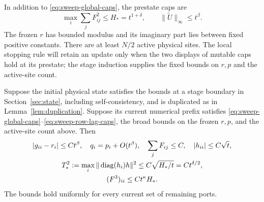 In addition to \eqref{eq:sweep-global-caps},
the prestate caps are
\begin{equation}\label{eq:sweep-row-lag-caps}
 \max_i\sum_jF_{ij}^2\le H_*=t^{1+\delta},
 \qquad \|\widetilde U\|_\infty\le t^\beta.
\end{equation}
The frozen $r$ has bounded modulus and its imaginary part lies between
fixed positive constants. There are at least $N/2$ active physical
sites. The local stopping rule will retain an update only when the two
displays of mutable caps hold at its prestate; the stage induction supplies
the fixed bounds on $r,p$ and the active-site count.

\begin{lemma}\label{lem:sweep-prestate}
Suppose the initial physical state satisfies the bounds at a stage boundary in
Section~\ref{sec:state}, including self-consistency, and is duplicated as
in Lemma~\ref{lem:duplication}. Suppose its current numerical prefix satisfies
\eqref{eq:sweep-global-caps}--\eqref{eq:sweep-row-lag-caps}, the broad
bounds on the frozen $r,p$, and the active-site count above. Then
\begin{gather}
 |g_{ii}-r_i|\le Ct^\beta,\quad q_i=p_i+O(t^\beta),\quad
 \sum_jF_{ij}\le C,\quad |h_{ii}|\le C\sqrt t,\label{eq:sweep-broad}\\
 T_*^2:=\max_i\|\operatorname{diag}(h_i)h\|^2
       \le C\sqrt{H_*/t}=Ct^{\delta/2},\label{eq:sweep-t-bound}\\
 (F^3)_{ii}\le Ct^\kappa H_*.\label{eq:sweep-f-cube}
\end{gather}
The bounds hold uniformly for every current set of remaining ports.
\end{lemma}

